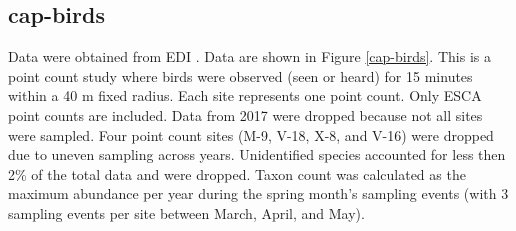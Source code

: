 \documentclass[11pt, oneside]{article}
\begin{document}
\subsection{cap-birds}
Data were obtained from EDI \citep{cap-birds}.
Data are shown in Figure \ref{cap-birds}.
This is a point count study where birds were observed (seen or heard) for 15 minutes within a 40 m fixed radius. 
Each site represents one point count. 
Only ESCA point counts are included. 
Data from 2017 were dropped because not all sites were sampled. 
Four point count sites (M-9, V-18, X-8, and V-16) were dropped due to uneven sampling across years. 
Unidentified species accounted for less then 2\% of the total data and were dropped. 
Taxon count was calculated as the maximum abundance per year during the spring month's sampling events (with 3 sampling events per site between March, April, and May). 
  
\end{document}
